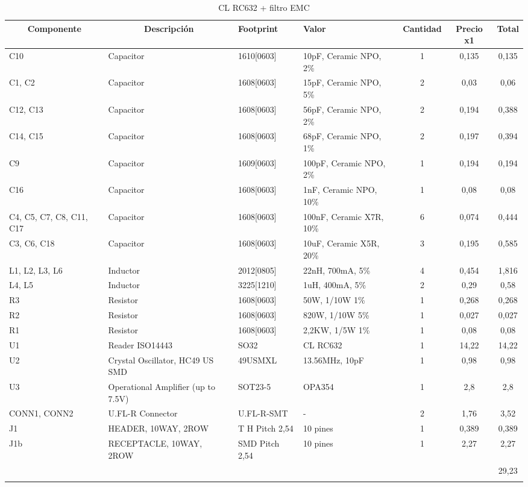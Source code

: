 \begin{longtable}{|p{1cm}|p{2.5cm}|p{2cm}|p{2.5cm}|c|c|c|}
\hline
\multicolumn{1}{|c|}{\textbf{Componente}} & \multicolumn{1}{c|}{\textbf{Descripción}} & \textbf{ Footprint} & \textbf{Valor} & \textbf{Cantidad} & \textbf{Precio x1} & \textbf{Total} \\ \hline
C10 & Capacitor & 1610[0603] & 10pF, Ceramic NPO, 2\% & 1 & 0,135 & 0,135 \\ \hline
C1, C2 & Capacitor & 1608[0603] & 15pF, Ceramic NPO, 5\% & 2 & 0,03 & 0,06 \\ \hline
C12, C13 & Capacitor & 1608[0603] & 56pF, Ceramic NPO, 2\% & 2 & 0,194 & 0,388 \\ \hline
C14, C15 & Capacitor & 1608[0603] & 68pF, Ceramic NPO, 1\% & 2 & 0,197 & 0,394 \\ \hline
C9 & Capacitor & 1609[0603] & 100pF, Ceramic NPO,  2\% & 1 & 0,194 & 0,194 \\ \hline
C16 & Capacitor & 1608[0603] & 1nF, Ceramic NPO, 10\% & 1 & 0,08 & 0,08 \\ \hline
C4, C5, C7, C8, C11, C17 & Capacitor & 1608[0603] & 100nF, Ceramic X7R, 10\% & 6 & 0,074 & 0,444 \\ \hline
C3, C6, C18 & Capacitor & 1608[0603] & 10uF, Ceramic X5R, 20\% & 3 & 0,195 & 0,585 \\ \hline
L1, L2, L3, L6 & Inductor & 2012[0805] & 22nH, 700mA, 5\% & 4 & 0,454 & 1,816 \\ \hline
L4, L5 & Inductor & 3225[1210] & 1uH, 400mA, 5\% & 2 & 0,29 & 0,58 \\ \hline
R3 & Resistor & 1608[0603] & 50W, 1/10W   1\% & 1 & 0,268 & 0,268 \\ \hline
R2 & Resistor & 1608[0603] & 820W, 1/10W   5\% & 1 & 0,027 & 0,027 \\ \hline
R1 & Resistor & 1608[0603] & 2,2KW, 1/5W   1\% & 1 & 0,08 & 0,08 \\ \hline
U1 & Reader ISO14443 & SO32 & CL RC632 & 1 & 14,22 & 14,22 \\ \hline
U2 & Crystal Oscillator, HC49 US SMD & 49USMXL & 13.56MHz, 10pF & 1 & 0,98 & 0,98 \\ \hline
U3 & Operational Amplifier (up to 7.5V) & SOT23-5 & OPA354 & 1 & 2,8 & 2,8 \\ \hline
CONN1, CONN2 & U.FL-R Connector & U.FL-R-SMT & - & 2 & 1,76 & 3,52 \\ \hline
J1 & HEADER, 10WAY, 2ROW & T H Pitch 2,54 & 10 pines & 1 & 0,389 & 0,389 \\ \hline
J1b & RECEPTACLE, 10WAY, 2ROW & SMD  Pitch 2,54 & 10 pines & 1 & 2,27 & 2,27 \\ \hline
 &  & \multicolumn{1}{l|}{} & \multicolumn{1}{l|}{} & \multicolumn{1}{l|}{} & \multicolumn{1}{l|}{} & 29,23 \\ \hline
\caption{CL RC632 + filtro EMC}
\label{}
\end{longtable}

